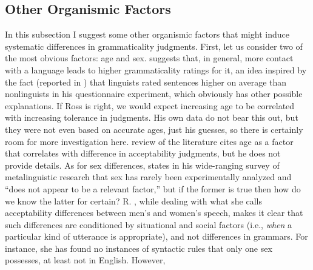 \subsection{Other Organismic Factors}\label{sec:4.3.3}

In this subsection I suggest some other organismic factors that might induce systematic differences in grammaticality judgments. First, let us consider two of the most obvious factors: age and sex. \citet{Ross1979} suggests that, in general, more contact with a language leads to higher grammaticality ratings for it, an idea inspired by the fact (reported in ) that linguists rated sentences higher on average than nonlinguists in his questionnaire experiment, which obviously has other possible explanations. If Ross is right, we would expect increasing age to be correlated with increasing tolerance in judgments. His own data do not bear this out, but they were not even based on accurate ages, just his guesses, so there is certainly room for more investigation here.  review of the literature cites age as a factor that correlates with difference in acceptability judgments, but he does not provide details. As for sex differences, \citet{Chaudron1983} states in his wide-ranging survey of metalinguistic research that sex has rarely been experimentally analyzed and ``does not appear to be a relevant factor,'' but if the former is true then how do we know the latter for certain? R. \citet{Lakoff1977}, while dealing with what she calls acceptability differences between men's and women's speech, makes it clear that such differences are conditioned by situational and social factors (i.e., \textit{when} a particular kind of utterance is appropriate), and not differences in grammars. For instance, she has found no instances of syntactic rules that only one sex possesses, at least not in English. However, \citet{Bever1992}
